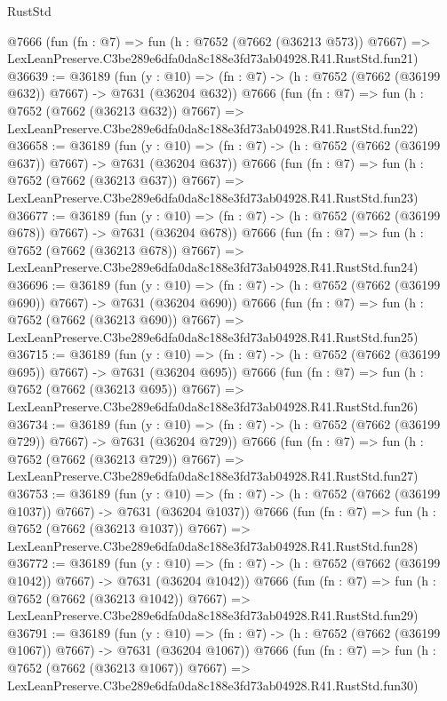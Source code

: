 \begin{lexlean}{RustStd}
\begin{coremodule}
    @7666
    (fun (fn : @7) =>
    fun (h : @7652 (@7662 (@36213 @573)) @7667) =>
    LexLeanPreserve.C3be289e6dfa0da8c188e3fd73ab04928.R41.RustStd.fun21)
@36639 := @36189
    (fun (y : @10) => (fn : @7) -> (h : @7652 (@7662 (@36199 @632)) @7667) -> @7631 (@36204 @632))
    @7666
    (fun (fn : @7) =>
    fun (h : @7652 (@7662 (@36213 @632)) @7667) =>
    LexLeanPreserve.C3be289e6dfa0da8c188e3fd73ab04928.R41.RustStd.fun22)
@36658 := @36189
    (fun (y : @10) => (fn : @7) -> (h : @7652 (@7662 (@36199 @637)) @7667) -> @7631 (@36204 @637))
    @7666
    (fun (fn : @7) =>
    fun (h : @7652 (@7662 (@36213 @637)) @7667) =>
    LexLeanPreserve.C3be289e6dfa0da8c188e3fd73ab04928.R41.RustStd.fun23)
@36677 := @36189
    (fun (y : @10) => (fn : @7) -> (h : @7652 (@7662 (@36199 @678)) @7667) -> @7631 (@36204 @678))
    @7666
    (fun (fn : @7) =>
    fun (h : @7652 (@7662 (@36213 @678)) @7667) =>
    LexLeanPreserve.C3be289e6dfa0da8c188e3fd73ab04928.R41.RustStd.fun24)
@36696 := @36189
    (fun (y : @10) => (fn : @7) -> (h : @7652 (@7662 (@36199 @690)) @7667) -> @7631 (@36204 @690))
    @7666
    (fun (fn : @7) =>
    fun (h : @7652 (@7662 (@36213 @690)) @7667) =>
    LexLeanPreserve.C3be289e6dfa0da8c188e3fd73ab04928.R41.RustStd.fun25)
@36715 := @36189
    (fun (y : @10) => (fn : @7) -> (h : @7652 (@7662 (@36199 @695)) @7667) -> @7631 (@36204 @695))
    @7666
    (fun (fn : @7) =>
    fun (h : @7652 (@7662 (@36213 @695)) @7667) =>
    LexLeanPreserve.C3be289e6dfa0da8c188e3fd73ab04928.R41.RustStd.fun26)
@36734 := @36189
    (fun (y : @10) => (fn : @7) -> (h : @7652 (@7662 (@36199 @729)) @7667) -> @7631 (@36204 @729))
    @7666
    (fun (fn : @7) =>
    fun (h : @7652 (@7662 (@36213 @729)) @7667) =>
    LexLeanPreserve.C3be289e6dfa0da8c188e3fd73ab04928.R41.RustStd.fun27)
@36753 := @36189
    (fun (y : @10) => (fn : @7) -> (h : @7652 (@7662 (@36199 @1037)) @7667) -> @7631 (@36204 @1037))
    @7666
    (fun (fn : @7) =>
    fun (h : @7652 (@7662 (@36213 @1037)) @7667) =>
    LexLeanPreserve.C3be289e6dfa0da8c188e3fd73ab04928.R41.RustStd.fun28)
@36772 := @36189
    (fun (y : @10) => (fn : @7) -> (h : @7652 (@7662 (@36199 @1042)) @7667) -> @7631 (@36204 @1042))
    @7666
    (fun (fn : @7) =>
    fun (h : @7652 (@7662 (@36213 @1042)) @7667) =>
    LexLeanPreserve.C3be289e6dfa0da8c188e3fd73ab04928.R41.RustStd.fun29)
@36791 := @36189
    (fun (y : @10) => (fn : @7) -> (h : @7652 (@7662 (@36199 @1067)) @7667) -> @7631 (@36204 @1067))
    @7666
    (fun (fn : @7) =>
    fun (h : @7652 (@7662 (@36213 @1067)) @7667) =>
    LexLeanPreserve.C3be289e6dfa0da8c188e3fd73ab04928.R41.RustStd.fun30)

\end{coremodule}
\end{lexlean}
